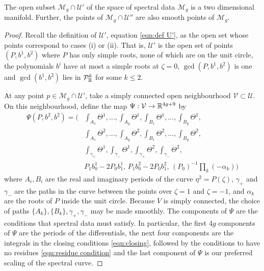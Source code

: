 \documentclass{article}
\begin{document}
\begin{thm}
\label{thm:moduli manifold}
The open subset $\mathcal{M}_g \cap \mathcal{U}'$ of the space of spectral data $\mathcal{M}_g$ is a two dimensional manifold. Further, the points of $\mathcal{M}_g \cap \mathcal{U}''$ are also smooth points of $\mathcal{M}_g$.

\begin{proof}
Recall the definition of $\mathcal{U}'$, equation \eqref{eqn:def U'}, as the open set whose points correspond to cases (i) or (ii). That is, $\mathcal{U}'$ is the open set of points $(P,b^1,b^2)$ where $P$ has only simple roots, none of which are on the unit circle, the polynomials $b^i$ have at most a simple roots at $\zeta=0$, $\gcd(P,b^1,b^2)$ is one and $\gcd(b^1,b^2)$ lies in $\mathcal{P}^k_{\mathbb{R}}$ for some $k \leq 2$.

At any point $p\in \mathcal{M}_g \cap \mathcal{U}'$, take a simply connected open neighbourhood $\mathcal{V}\subset \mathcal{U}$. On this neighbourhood, define the map $\Psi : \mathcal{V} \to \mathbb{R}^{4g+9}$ by
\begin{align*}
\Psi(P,b^2,b^2) = \Big(
& \int_{A_1} \Theta^1, \dots, \int_{A_g} \Theta^1, \int_{B_1} \Theta^1, \dots, \int_{B_g} \Theta^1, \\
& \int_{A_1} \Theta^2, \dots, \int_{A_g} \Theta^2, \int_{B_1} \Theta^2, \dots, \int_{B_g} \Theta^2, \\
& \int_{\gamma_+} \Theta^1, \int_{\gamma_-} \Theta^1, \int_{\gamma_+} \Theta^2, \int_{\gamma_-} \Theta^2, \\
& P_1b^1_0 - 2P_0b^1_1,\, P_1b^2_0 - 2P_0b^2_1,\, (P_0)^{-1} \prod_{k}(-\alpha_k)
\Big)
\end{align*}
where $A_i, B_i$ are the real and imaginary periods of the curve $\eta^2 = P(\zeta)$, $\gamma_+$ and $\gamma_-$ are the paths in the curve between the points over $\zeta=1$ and $\zeta=-1$, and $\alpha_k$ are the roots of $P$ inside the unit circle. Because $V$ is simply connected, the choice of paths $\{A_k\}, \{B_k\}, \gamma_+, \gamma_-$ may be made smoothly. The components of $\Psi$ are the conditions that spectral data must satisfy. In particular, the first $4g$ components of $\Psi$ are the periods of the differentials, the next four components are the integrals in the closing conditions \eqref{eqn:closing}, followed by the conditions to have no residues \eqref{eqn:residue condition} and the last component of $\Psi$ is our preferred scaling of the spectral curve.


\end{proof}
\end{thm}
\end{document}

